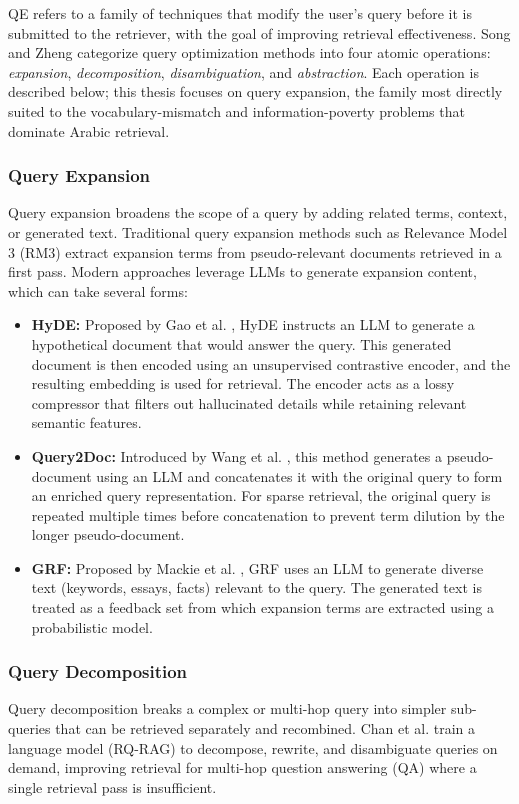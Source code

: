 QE refers to a family of techniques that modify the user's query before it is submitted to the retriever, with the goal of improving retrieval effectiveness. Song and Zheng \cite{song_2024_a} categorize query optimization methods into four atomic operations: \textit{expansion}, \textit{decomposition}, \textit{disambiguation}, and \textit{abstraction}. Each operation is described below; this thesis focuses on query expansion, the family most directly suited to the vocabulary-mismatch and information-poverty problems that dominate Arabic retrieval.

\subsubsection{Query Expansion}
Query expansion broadens the scope of a query by adding related terms, context, or generated text. Traditional query expansion methods such as Relevance Model 3 (RM3) extract expansion terms from pseudo-relevant documents retrieved in a first pass. Modern approaches leverage LLMs to generate expansion content, which can take several forms:

\begin{itemize}
    \item \textbf{HyDE:} Proposed by Gao et al. \cite{gao_2022_precise}, HyDE instructs an LLM to generate a hypothetical document that would answer the query. This generated document is then encoded using an unsupervised contrastive encoder, and the resulting embedding is used for retrieval. The encoder acts as a lossy compressor that filters out hallucinated details while retaining relevant semantic features.
    \item \textbf{Query2Doc:} Introduced by Wang et al. \cite{wang_2023_query2doc}, this method generates a pseudo-document using an LLM and concatenates it with the original query to form an enriched query representation. For sparse retrieval, the original query is repeated multiple times before concatenation to prevent term dilution by the longer pseudo-document.
    \item \textbf{GRF:} Proposed by Mackie et al. \cite{mackie_2023_grf}, GRF uses an LLM to generate diverse text (keywords, essays, facts) relevant to the query. The generated text is treated as a feedback set from which expansion terms are extracted using a probabilistic model.
\end{itemize}

\subsubsection{Query Decomposition}
Query decomposition breaks a complex or multi-hop query into simpler sub-queries that can be retrieved separately and recombined. Chan et al. \cite{chan_2024_rqrag} train a language model (RQ-RAG) to decompose, rewrite, and disambiguate queries on demand, improving retrieval for multi-hop question answering (QA) where a single retrieval pass is insufficient.

